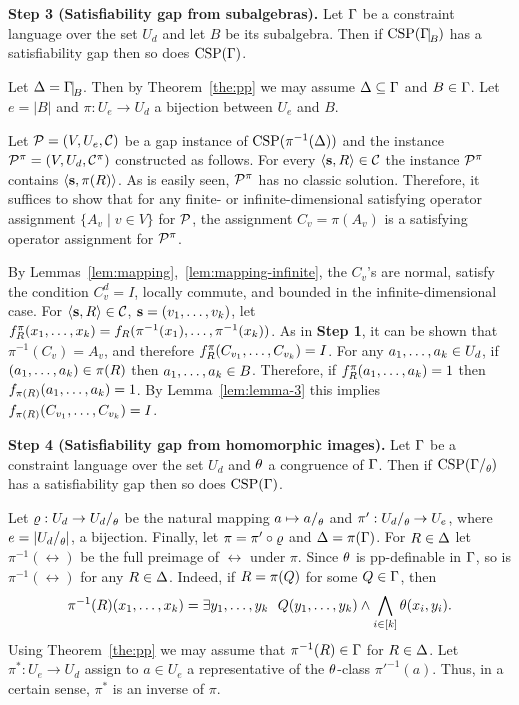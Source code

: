 \documentclass[11pt,letter]{article}
\begin{document}
\medskip

{\bf Step 3 (Satisfiability gap from subalgebras).}
Let $\Gamma$ be a constraint language over the set $U_d$ and let $B$ be its subalgebra.
Then if $\CSP(\Gm\red B)$ has a satisfiability gap then so does ${\rm CSP}(\Gamma)$.

\smallskip

Let $\Dl=\Gm\red B$. Then by Theorem~\ref{the:pp} we may assume $\Delta\subseteq\Gamma$ and $B\in\Gamma$. Let $e=|B|$ and $\pi:U_e\to U_d$ a bijection between $U_e$ and $B$. 

Let ${\mathcal P}=(V,U_e,{\mathcal C})$ be a gap instance of ${\rm CSP}(\pi^{-1}(\Delta))$ and the instance ${\mathcal P}^\pi=(V,U_d,{\mathcal C}^\pi)$ constructed as follows. For every $\langle {\bf s},R \rangle\in{\mathcal C}$ the instance ${\mathcal P}^\pi$ contains $\langle {\bf s},\pi(R) \rangle$. As is easily seen, ${\mathcal P}^\pi$ has no classic solution. Therefore, it suffices to show that for any finite- or infinite-dimensional satisfying operator assignment $\{A_v\mid v\in V\}$ for ${\mathcal P}$, the assignment $C_v=\pi(A_v)$ is a satisfying operator assignment for ${\mathcal P}^\pi$.

By Lemmas~\ref{lem:mapping},~\ref{lem:mapping-infinite}, the $C_v$'s are normal, satisfy the condition $C_v^d=I$, locally commute, and bounded in the infinite-dimensional case. For $\langle {\bf s},R \rangle\in{\mathcal C}$, ${\bf s}=(v _1,\ldots, v _{k})$, let $f^\pi_R(x _1,\ldots, x _{k})=f_R(\pi^{-1}(x_1),\ldots,\pi^{-1}(x_k))$. As in \textbf{Step 1}, it can be shown that $\pi^{-1}(C_v)=A_v$, and therefore $f^\pi_R(C_{v_1},\ldots, C_{v_k})=I$. For any $a _1,\ldots, a _{k}\in U_d$, if $(a _1,\ldots, a _{k})\in\pi(R)$ then $a _1,\ldots, a _{k}\in B$. Therefore, if $f^\pi_R(a _1,\ldots, a _{k})=1$ then $f_{\pi(R)}(a _1,\ldots, a _{k})=1$. By Lemma~\ref{lem:lemma-3} this implies $f_{\pi(R)}(C_{v_1},\ldots, C_{v_k})=I$.

\smallskip

{\bf Step 4 (Satisfiability gap from homomorphic images).}
Let $\Gamma$ be a constraint language over the set $U_d$ and $\theta$ a congruence of
$\Gamma$.  Then if $\CSP(\Gm\fac\th)$ has a satisfiability gap then so does ${\rm CSP}(\Gamma)$.

\smallskip

Let $\vr:U_d\to U_d\fac\th$ be the natural mapping $a\mapsto a\fac\th$ and $\pi':U_d\fac\th\to U_e$, where $e=|U_d\fac\th|$, a bijection. Finally, let $\pi=\pi'\circ\varrho$ and $\Delta=\pi(\Gamma)$. For $R\in\Delta$ let $\pi^{-1}(\rel)$ be the full preimage of $\rel$ under $\pi$. Since $\theta$ is pp-definable in $\Gamma$, so is $\pi^{-1}(\rel)$ for any $R\in\Delta$. Indeed, if $R=\pi(Q)$ for some $Q\in\Gamma$, then 
\[
\pi^{-1}(R)(x _1,\ldots, x _{k})=\exists y _1,\ldots, y _{k}\ \ Q(y _1,\ldots, y _{k})\wedge\bigwedge_{i\in[k]}\theta(x_i,y_i).
\]
Using Theorem~\ref{the:pp} we may assume that $\pi^{-1}(R)\in\Gamma$ for $R\in\Delta$. Let $\pi^*:U_e\to U_d$ assign to $a\in U_e$ a representative of the $\theta$-class $\pi'^{-1}(a)$. Thus, in a certain sense, $\pi^*$ is an inverse of $\pi$.  
\end{document}
